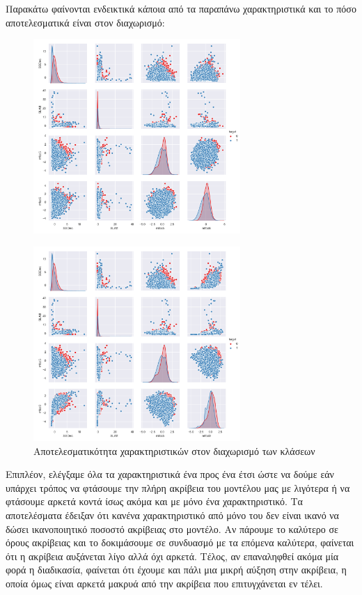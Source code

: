 \par Παρακάτω φαίνονται ενδεικτικά κάποια από τα παραπάνω χαρακτηριστικά και το πόσο αποτελεσματικά είναι στον διαχωρισμό:

\begin{figure}[H]
\centering
\includegraphics[width=0.7\textwidth]{figure_1.png}
\end{figure}
\begin{figure}[h]
\centering
\includegraphics[width=0.7\textwidth]{figure_2.png}
\caption{Αποτελεσματικότητα χαρακτηριστικών στον διαχωρισμό των κλάσεων}
\end{figure}


Eπιπλέον, ελέγξαμε όλα τα χαρακτηριστικά ένα προς ένα έτσι ώστε να δούμε εάν υπάρχει τρόπος να φτάσουμε την πλήρη ακρίβεια του μοντέλου μας με λιγότερα ή να φτάσουμε αρκετά κοντά ίσως ακόμα και με μόνο ένα χαρακτηριστικό. 
Tα αποτελέσματα έδειξαν ότι κανένα χαρακτηριστικό από μόνο του δεν είναι ικανό να δώσει ικανοποιητικό ποσοστό ακρίβειας στο μοντέλο. Αν πάρουμε το καλύτερο σε όρους ακρίβειας και το δοκιμάσουμε σε συνδυασμό με τα επόμενα καλύτερα, φαίνεται ότι η ακρίβεια αυξάνεται λίγο αλλά όχι αρκετά.  
Τέλος, αν επαναληφθεί ακόμα μία φορά η διαδικασία, φαίνεται ότι έχουμε και πάλι μια μικρή αύξηση στην ακρίβεια, η οποία όμως είναι αρκετά μακρυά από την ακρίβεια που επιτυγχάνεται εν τέλει. 

